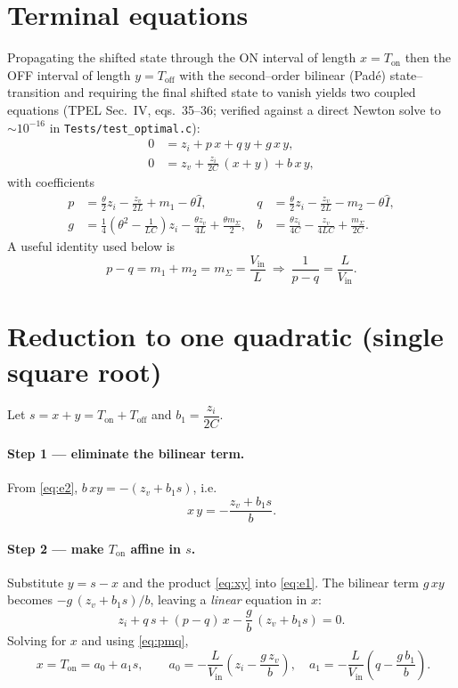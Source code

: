 \documentclass[11pt]{article}
\newcommand{\Ton}{T_{\mathrm{on}}}
\newcommand{\Toff}{T_{\mathrm{off}}}
\newcommand{\Vin}{V_{\mathrm{in}}}
\begin{document}
\section{Terminal equations}
Propagating the shifted state through the ON interval of length $x=\Ton$ then the
OFF interval of length $y=\Toff$ with the second--order bilinear (Pad\'e)
state--transition and requiring the final shifted state to vanish yields two
coupled equations (TPEL Sec.~IV, eqs.~35--36; verified against a direct Newton
solve to $\sim\!10^{-16}$ in \texttt{Tests/test\_optimal.c}):
\begin{align}
0&=z_i+p\,x+q\,y+g\,x\,y, \label{eq:e1}\\
0&=z_v+\tfrac{z_i}{2C}\,(x+y)+b\,x\,y, \label{eq:e2}
\end{align}
with coefficients
\begin{align}
p&=\tfrac{\theta}{2}z_i-\tfrac{z_v}{2L}+m_1-\theta\hat I, &
q&=\tfrac{\theta}{2}z_i-\tfrac{z_v}{2L}-m_2-\theta\hat I,\\
g&=\tfrac14\!\left(\theta^2-\tfrac{1}{LC}\right)z_i-\tfrac{\theta z_v}{4L}
   +\tfrac{\theta m_\Sigma}{2}, &
b&=\tfrac{\theta z_i}{4C}-\tfrac{z_v}{4LC}+\tfrac{m_\Sigma}{2C}.
\end{align}
A useful identity used below is
\begin{equation}
p-q=m_1+m_2=m_\Sigma=\frac{\Vin}{L}\ \Longrightarrow\ \frac{1}{p-q}=\frac{L}{\Vin}.
\label{eq:pmq}
\end{equation}

\section{Reduction to one quadratic (single square root)}
Let $s=x+y=\Ton+\Toff$ and $b_1=\dfrac{z_i}{2C}$.

\paragraph{Step 1 --- eliminate the bilinear term.}
From \eqref{eq:e2}, $b\,x y=-(z_v+b_1 s)$, i.e.
\begin{equation}
x\,y=-\frac{z_v+b_1 s}{b}. \label{eq:xy}
\end{equation}

\paragraph{Step 2 --- make $\Ton$ affine in $s$.}
Substitute $y=s-x$ and the product \eqref{eq:xy} into \eqref{eq:e1}. The bilinear
term $g\,x y$ becomes $-g\,(z_v+b_1 s)/b$, leaving a \emph{linear} equation in $x$:
\begin{equation}
z_i+q\,s+(p-q)\,x-\frac{g}{b}\,(z_v+b_1 s)=0 .
\end{equation}
Solving for $x$ and using \eqref{eq:pmq},
\begin{equation}
\boxed{\;x=\Ton=a_0+a_1 s,\qquad
a_0=-\frac{L}{\Vin}\!\left(z_i-\frac{g\,z_v}{b}\right),\quad
a_1=-\frac{L}{\Vin}\!\left(q-\frac{g\,b_1}{b}\right).}
\label{eq:affine}
\end{equation}
\end{document}
